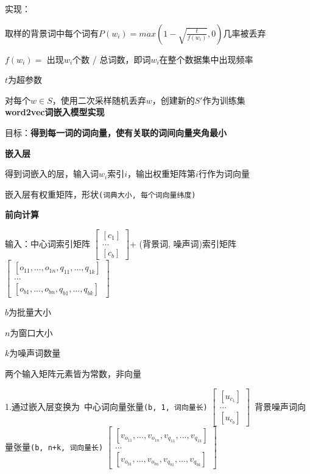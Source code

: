 \documentclass[UTF8]{ctexart}
\begin{document}
  实现：
  
  \quad 取样的背景词中每个词有$P(w_i) = max(1-\sqrt{\frac{t}{f(w_i)}}, 0)$几率被丢弃

  \quad \quad $f(w_i) = $ 出现$w_i$个数 / 总词数，即词$w_i$在整个数据集中出现频率

  \quad \quad $t$为超参数

  \quad 对每个$w \in S$，使用二次采样随机丢弃$w$，创建新的$S'$作为训练集\\
\textbf{word2vec词嵌入模型实现}

  目标：\textbf{得到每一词的词向量，使有关联的词间向量夹角最小}

  \textbf{嵌入层}

  \quad 得到词嵌入的层，输入词$w_i$索引$i$，输出权重矩阵第$i$行作为词向量

  \quad 嵌入层有权重矩阵，形状\texttt{(词典大小, 每个词向量纬度)}

  \textbf{前向计算}

  \quad 输入：中心词索引矩阵
    $\begin{bmatrix}
      [c_1] \\
      ... \\
      [c_b]
      \end{bmatrix}
    $+ (背景词, 噪声词)索引矩阵
    $\begin{bmatrix}
      [o_{11}, ..., o_{1n}, q_{11}, ..., q_{1k}] \\
      ... \\
      [o_{b1}, ..., o_{bn}, q_{b1}, ..., q_{bk}]
      \end{bmatrix}
    $

  \quad \quad $b$为批量大小

  \quad \quad $n$为窗口大小

  \quad \quad $k$为噪声词数量

  \quad \quad 两个输入矩阵元素皆为常数，非向量

  \quad 1.通过嵌入层变换为\ 中心词向量张量\texttt{(b, 1, 词向量长)}
  $\begin{bmatrix}
    [u_{c_1}] \\
    ... \\
    [u_{c_b}]
    \end{bmatrix}
  $\ 背景噪声词向量张量\texttt{(b, n+k, 词向量长)}
  $\begin{bmatrix}
    [v_{o_{11}}, ..., v_{o_{1n}}, v_{q_{11}}, ..., v_{q_{1k}}] \\
    ... \\
    [v_{o_{b1}}, ..., v_{o_{bn}}, v_{q_{b1}}, ..., v_{q_{bk}}]
    \end{bmatrix}
  $
\end{document}
